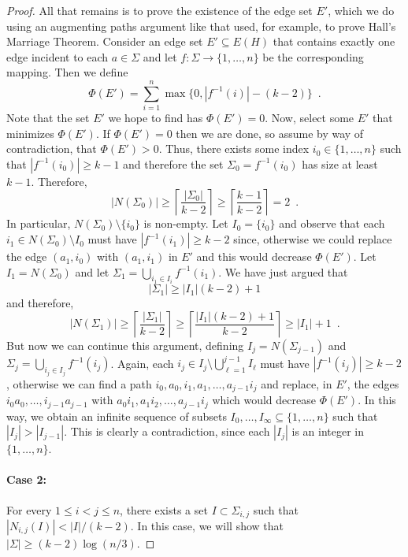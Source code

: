 \documentclass{llncs}
\begin{document}
\begin{proof}
   All that remains is to prove the existence of the edge set $E'$, which
   we do using an augmenting paths argument like that used, for example,
   to prove Hall's Marriage Theorem.  Consider an edge set $E'\subseteq
   E(H)$ that contains exactly one edge incident to each $a\in\Sigma$
   and let $f:\Sigma\to\{1,\ldots,n\}$ be the corresponding mapping.
   Then we define
   \[
      \Phi(E') = \sum_{i=1}^n\max\{0, |f^{-1}(i)|-(k-2)\} \enspace .
   \]
   Note that the set $E'$ we hope to find has $\Phi(E')=0$.  Now, select
   some $E'$ that minimizes $\Phi(E')$.  If $\Phi(E')=0$ then we are done,
   so assume by way of contradiction, that $\Phi(E') > 0$.  Thus, there
   exists some index $i_0\in\{1,\ldots,n\}$ such that $|f^{-1}(i_0)|\ge k-1$
   and therefore the set $\Sigma_0=f^{-1}(i_0)$ has size at least $k-1$.
   Therefore, 
   \[
       |N(\Sigma_0)| \ge \left\lceil\frac{|\Sigma_0|}{k-2}\right\rceil \ge 
\left\lceil\frac{k-1}{k-2}\right\rceil = 2 \enspace .
   \]
   In particular, $N(\Sigma_0)\setminus\{i_0\}$ is non-empty.  Let
   $I_0=\{i_0\}$ and observe that each $i_1\in N(\Sigma_0)\setminus I_0$
   must have $|f^{-1}(i_1)|\ge k-2$ since, otherwise we could replace
   the edge $(a_1,i_0)$ with $(a_1,i_1)$ in $E'$ and this would decrease
   $\Phi(E')$.  Let $I_1=N(\Sigma_0)$ and let $\Sigma_1=\bigcup_{i_1\in
   I_i} f^{-1}(i_1)$.  We have just argued that
   \[
        |\Sigma_1|\ge |I_1|(k-2)+1
   \]
   and therefore, 
   \[
          |N(\Sigma_1)| \ge \left\lceil\frac{|\Sigma_1|}{k-2}\right\rceil
            \ge \left\lceil\frac{|I_1|(k-2)+1}{k-2}\right\rceil
            \ge |I_1|+1 \enspace .
   \]
   But now we can continue this argument, defining $I_j=N(\Sigma_{j-1})$
   and $\Sigma_j=\bigcup_{i_j\in I_j} f^{-1}(i_j)$.  Again,
   each $i_j\in I_j\setminus \bigcup_{\ell=1}^{j-1} I_\ell$
   must have $|f^{-1}(i_j)|\ge k-2$, otherwise we can find a path
   $i_0,a_0,i_1,a_1,\ldots,a_{j-1}i_j$ and replace, in $E'$, the edges
   $i_0a_0,\ldots,i_{j-1}a_{j-1}$ with $a_0i_1,a_1i_2,\ldots,a_{j-1}i_j$
   which would decrease $\Phi(E')$.  In this way, we obtain an infinite
   sequence of subsets $I_0,\ldots,I_\infty\subseteq \{1,\ldots,n\}$
   such that $|I_{j}|>|I_{j-1}|$.  This is clearly a contradiction,
   since each $|I_j|$ is an integer in $\{1,\ldots,n\}$.

   \paragraph{Case 2:}
   For every $1\le i< j\le n$, there exists a set $I\subset\Sigma_{i,j}$
   such that $|N_{i,j}(I)| < |I|/(k-2)$.  In this case, we will show
   that $|\Sigma|\ge (k-2)\log(n/3)$.


\end{proof}
\end{document}
